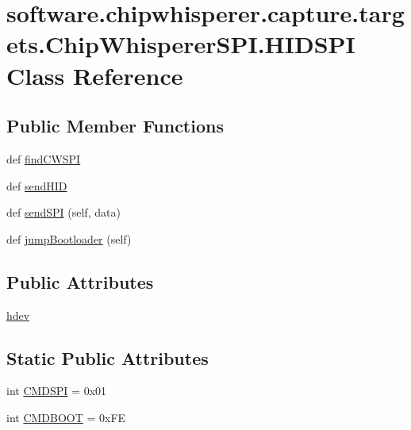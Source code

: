 \hypertarget{classsoftware_1_1chipwhisperer_1_1capture_1_1targets_1_1ChipWhispererSPI_1_1HIDSPI}{}\section{software.\+chipwhisperer.\+capture.\+targets.\+Chip\+Whisperer\+S\+P\+I.\+H\+I\+D\+S\+P\+I Class Reference}
\label{classsoftware_1_1chipwhisperer_1_1capture_1_1targets_1_1ChipWhispererSPI_1_1HIDSPI}
\subsection*{Public Member Functions}
\begin{DoxyCompactItemize}
\item 
def \hyperlink{classsoftware_1_1chipwhisperer_1_1capture_1_1targets_1_1ChipWhispererSPI_1_1HIDSPI_a1c5730b19f598f262d74aa6196165cd3}{find\+C\+W\+S\+P\+I}
\item 
def \hyperlink{classsoftware_1_1chipwhisperer_1_1capture_1_1targets_1_1ChipWhispererSPI_1_1HIDSPI_ac773c50e4f5cb45f61948f7a493abbb6}{send\+H\+I\+D}
\item 
def \hyperlink{classsoftware_1_1chipwhisperer_1_1capture_1_1targets_1_1ChipWhispererSPI_1_1HIDSPI_a91b6abf5ebd9427d6e4c4405513abd86}{send\+S\+P\+I} (self, data)
\item 
def \hyperlink{classsoftware_1_1chipwhisperer_1_1capture_1_1targets_1_1ChipWhispererSPI_1_1HIDSPI_a92679fc15e902f26c325b57ab37fad8e}{jump\+Bootloader} (self)
\end{DoxyCompactItemize}
\subsection*{Public Attributes}
\begin{DoxyCompactItemize}
\item 
\hyperlink{classsoftware_1_1chipwhisperer_1_1capture_1_1targets_1_1ChipWhispererSPI_1_1HIDSPI_aef45e7999ed3ab1854fc0e8cdbaf17c9}{hdev}
\end{DoxyCompactItemize}
\subsection*{Static Public Attributes}
\begin{DoxyCompactItemize}
\item 
int \hyperlink{classsoftware_1_1chipwhisperer_1_1capture_1_1targets_1_1ChipWhispererSPI_1_1HIDSPI_a354b44caf013600916c2bdcf39fa8db6}{C\+M\+D\+S\+P\+I} = 0x01
\item 
int \hyperlink{classsoftware_1_1chipwhisperer_1_1capture_1_1targets_1_1ChipWhispererSPI_1_1HIDSPI_adb36a3e942a2a82ef51bcab13f9ef156}{C\+M\+D\+B\+O\+O\+T} = 0x\+F\+E
\end{DoxyCompactItemize}


